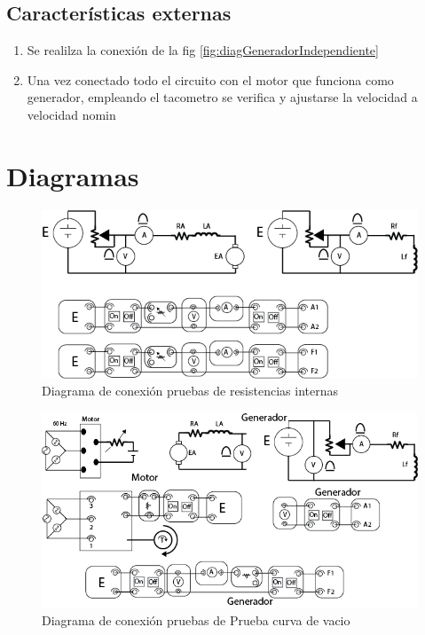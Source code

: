 \documentclass[11pt,letterpaper]{article}     %
\begin{document}
\subsection{Características externas}
\begin{enumerate}
    \item Se realilza la conexión de la fig \ref{fig:diagGeneradorIndependiente}
    \item Una vez conectado todo el circuito con el motor que funciona como generador, empleando el tacometro se verifica y ajustarse la velocidad a velocidad nomin
\end{enumerate}
\section{Diagramas}
\begin{figure}[H]
    \centering
    \includegraphics[scale=0.5]{./recursos-Lab6/diagMedRes.png}
    \caption{Diagrama de conexión pruebas de resistencias internas}
    \label{fig:diagMedRes}
\end{figure}
\begin{figure}[H]
    \centering
    \includegraphics[scale=0.5]{./recursos-Lab6/diagMedCurvaVacio.png}
    \caption{Diagrama de conexión pruebas de Prueba curva de vacio}
    \label{fig:diagMedCurvaCaracteristica}
\end{figure}
\end{document}
